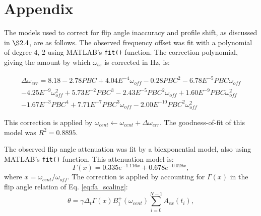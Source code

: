 \documentclass{article}
\begin{document}
\section {Appendix}
The models used to correct for flip angle inaccuracy and profile shift, as discussed in $\S 2.4$, are as follows.
The observed frequency offset was fit with a polynomial of degree 4, 2 using MATLAB's \texttt{fit()} function. 
The correction polynomial, giving the amount by which $\omega_{bs}$ is corrected in Hz, is:

\begin{multline}
    \Delta\omega_{err} = 8.18 - 2.78PBC + 4.04E^{-4}\omega_{off} - 0.28PBC^2 - 6.78E^{-5} PBC \omega_{off}\\ - 4.25E^{-9}\omega_{off}^2 + 5.73E^{-2}PBC^3 - 2.43E^{-5}PBC^2\omega_{off} + 1.60E^{-9}PBC\omega_{off}^2 \\- 1.67E^{-3}PBC^4 + 7.71E^{-7}PBC^3\omega_{off} - 2.00E^{-10}PBC^2\omega_{off}^2
\end{multline}

This correction is applied by $\omega_{cent} \leftarrow \omega_{cent} + \Delta\omega_{err} $. The goodness-of-fit of this model was $R^2=0.8895$.

\par The observed flip angle attenuation was fit by a biexponential model, also using MATLAB's \texttt{fit()} function. 
This attenuation model is: 
\begin{equation}
    \Gamma(x) = 0.335e^{-1.116x}+0.678e^{-0.028x},
\end{equation}
where $x= \omega_{cent}/\omega_{off}$.
The correction is applied by accounting for $\Gamma(x)$ in the flip angle relation of Eq. \ref{eq:fa_scaling}:
\begin{equation}
    \theta = \gamma \Delta_t \Gamma(x) B_1^+(\omega_{cent})  \sum_{i=0}^{N-1} A_{ex}(t_i),
\end{equation}



\end{document}
